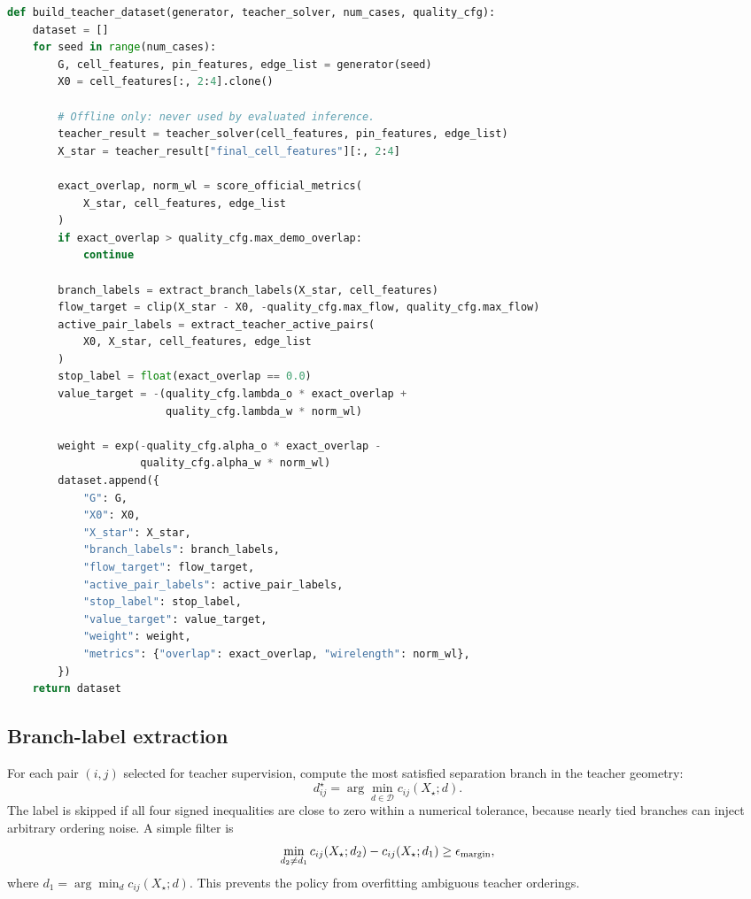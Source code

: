 \documentclass[11pt]{article}
\newcommand{\Branch}{\mathcal{D}}
\begin{document}
\begin{lstlisting}[language=Python]
def build_teacher_dataset(generator, teacher_solver, num_cases, quality_cfg):
    dataset = []
    for seed in range(num_cases):
        G, cell_features, pin_features, edge_list = generator(seed)
        X0 = cell_features[:, 2:4].clone()

        # Offline only: never used by evaluated inference.
        teacher_result = teacher_solver(cell_features, pin_features, edge_list)
        X_star = teacher_result["final_cell_features"][:, 2:4]

        exact_overlap, norm_wl = score_official_metrics(
            X_star, cell_features, edge_list
        )
        if exact_overlap > quality_cfg.max_demo_overlap:
            continue

        branch_labels = extract_branch_labels(X_star, cell_features)
        flow_target = clip(X_star - X0, -quality_cfg.max_flow, quality_cfg.max_flow)
        active_pair_labels = extract_teacher_active_pairs(
            X0, X_star, cell_features, edge_list
        )
        stop_label = float(exact_overlap == 0.0)
        value_target = -(quality_cfg.lambda_o * exact_overlap +
                         quality_cfg.lambda_w * norm_wl)

        weight = exp(-quality_cfg.alpha_o * exact_overlap -
                     quality_cfg.alpha_w * norm_wl)
        dataset.append({
            "G": G,
            "X0": X0,
            "X_star": X_star,
            "branch_labels": branch_labels,
            "flow_target": flow_target,
            "active_pair_labels": active_pair_labels,
            "stop_label": stop_label,
            "value_target": value_target,
            "weight": weight,
            "metrics": {"overlap": exact_overlap, "wirelength": norm_wl},
        })
    return dataset
\end{lstlisting}

\subsection{Branch-label extraction}

For each pair $(i,j)$ selected for teacher supervision, compute the most satisfied separation branch in the teacher geometry:
\[
    d_{ij}^{\star}=\arg\min_{d\in\Branch} c_{ij}(X_\star;d).
\]
The label is skipped if all four signed inequalities are close to zero within a numerical tolerance, because nearly tied branches can inject arbitrary ordering noise. A simple filter is
\[
    \min_{d_2\ne d_1}c_{ij}(X_\star;d_2)-c_{ij}(X_\star;d_1)\ge \epsilon_{\rm margin},
\]
where $d_1=\arg\min_d c_{ij}(X_\star;d)$. This prevents the policy from overfitting ambiguous teacher orderings.
\end{document}
